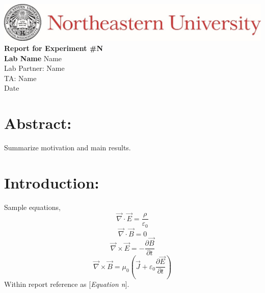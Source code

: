 \documentclass[12pt,a4paper]{article}
\begin{document}
	\begin{center}
		\includegraphics{Header}
		\vfill		
		\textbf{\Large{Report for Experiment \#N\\
		Lab Name}}
		\vfill
		Name\\
		Lab Partner: Name\\
		TA: Name\\
		Date
		\vfill
	\end{center}
	
	\section*{Abstract:}
		Summarize motivation and main results.
	
	\newpage
	
	\section*{Introduction:}
		Sample equations,
		\[ \vec{\nabla} \cdot \vec{E} = \frac{\rho}{\varepsilon_0} \tag{1} \]
		\[ \vec{\nabla} \cdot \vec{B} = 0 \tag{2} \]
		\[ \vec{\nabla} \times \vec{E} = - \frac{\partial \vec{B}}{\partial t} \tag{3} \]
		\[ \vec{\nabla} \times \vec{B} = \mu_0 \left( \vec{J} + \varepsilon_0 \frac{\partial \vec{E}}{\partial t} \right) \tag{4} \]
		Within report reference as [\textit{Equation n}].
\end{document}
